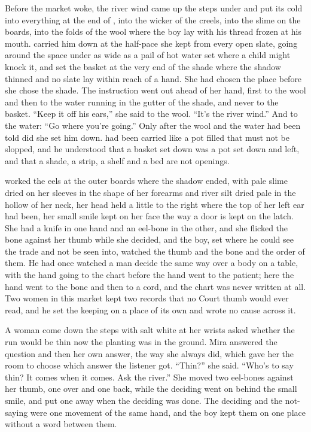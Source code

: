 
Before the market woke, the river wind came up the steps under  and put its cold into everything at the end of , into the wicker of the creels, into the slime on the boards, into the folds of the wool where the boy lay with his thread frozen at his mouth.  carried him down  at the half-pace she kept from every open slate, going around the space under  as wide as a pail of hot water set where a child might knock it, and set the basket at the very end of the shade where the shadow thinned and no slate lay within reach of a hand. She had chosen the place before she chose the shade. The instruction went out ahead of her hand, first to the wool and then to the water running in the gutter of the shade, and never to the basket. “Keep it off his ears,” she said to the wool. “It's the river wind.” And to the water: “Go where you're going.” Only after the wool and the water had been told did she set him down.  had been carried like a pot filled that must not be slopped, and he understood that a basket set down was a pot set down and left, and that a shade, a strip, a shelf and a bed are not openings.

 worked the eels at the outer boards where the shadow ended, with pale slime dried on her sleeves in the shape of her forearms and river silt dried pale in the hollow of her neck, her head held a little to the right where the top of her left ear had been, her small smile kept on her face the way a door is kept on the latch. She had a knife in one hand and an eel-bone in the other, and she flicked the bone against her thumb while she decided, and the boy, set where he could see the trade and not be seen into, watched the thumb and the bone and the order of them. He had once watched a man decide the same way over a body on a table, with the hand going to the chart before the hand went to the patient; here the hand went to the bone and then to a cord, and the chart was never written at all. Two women in this market kept two records that no Court thumb would ever read, and he set the keeping on a place of its own and wrote no cause across it.

A woman come down the steps with salt white at her wrists asked whether the run would be thin now the planting was in the ground. Mira answered the question and then her own answer, the way she always did, which gave her the room to choose which answer the listener got. “Thin?” she said. “Who's to say thin? It comes when it comes. Ask the river.” She moved two eel-bones against her thumb, one over and one back, while the deciding went on behind the small smile, and put one away when the deciding was done. The deciding and the not-saying were one movement of the same hand, and the boy kept them on one place without a word between them.

